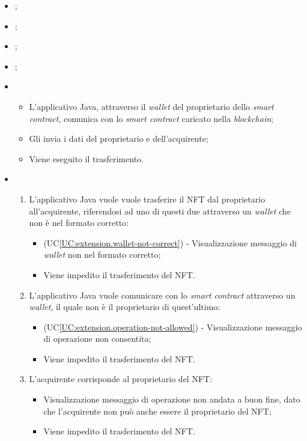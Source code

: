 \begin{itemize}
  \item {};
  \item {};
  \item {};
  \item {};
  
  \item \UCMain
  \begin{itemize}
    \item L'applicativo Java, attraverso il \textit{wallet} del proprietario dello \textit{smart contract}, comunica con lo \textit{smart contract} caricato nella \textit{blockchain};
    \item Gli invia i dati del proprietario e dell'acquirente;
    \item Viene eseguito il trasferimento.
  \end{itemize}

  \item \UCExt
  \begin{enumerate}[label=\lett]
    \item L'applicativo Java vuole vuole trasferire il NFT dal proprietario all'acquirente, riferendosi ad uno di questi due attraverso un \textit{wallet} che non è nel formato corretto:
    \begin{itemize}
      \item (UC\ref{UC:extension.wallet-not-correct}) - Visualizzazione messaggio di \textit{wallet} non nel formato corretto;
      \item Viene impedito il trasferimento del NFT.
    \end{itemize}

    \item L'applicativo Java vuole comunicare con lo \textit{smart contract} attraverso un \textit{wallet}, il quale non è il proprietario di quest'ultimo:
    \begin{itemize}
      \item (UC\ref{UC:extension.operation-not-allowed}) - Visualizzazione messaggio di operazione non consentita;
      \item Viene impedito il trasferimento del NFT.
    \end{itemize}

    \item L'acquirente corrisponde al proprietario del NFT:
    \begin{itemize}
      \item Visualizzazione messaggio di operazione non andata a buon fine, dato che l'acquirente non può anche essere il proprietario del NFT;
      \item Viene impedito il trasferimento del NFT.
    \end{itemize}
  \end{enumerate}
\end{itemize}

